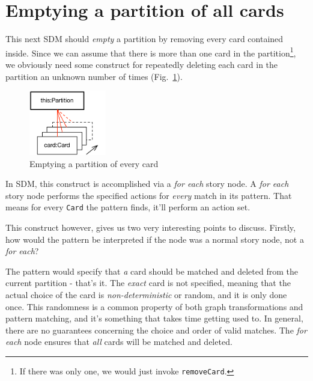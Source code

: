 \newpage
\section{Emptying a partition of all cards}
\genHeader
\hypertarget{sec:emptyPartition}{}

This next SDM should \emph{empty} a partition by removing every card contained inside. Since we can assume that there is more than one card in the
partition\footnote{If there was only one, we would just invoke \texttt{removeCard}.}, we obviously need some construct for repeatedly deleting each card in the
partition an unknown number of times (Fig.~\ref{fig:goal_empty}). 

\vspace{0.5cm}

\begin{figure}[htbp]
	\centering
  \includegraphics[width=0.3\textwidth]{goal_partitionEmpty.pdf}
	\caption{Emptying a partition of every card}
	\label{fig:goal_empty}
\end{figure}
\FloatBarrier

\vspace{0.5cm}

In SDM, this  construct is accomplished via a \emph{for each} story node. A
\emph{for each} story node performs the specified actions for \emph{every} match in its pattern. That means for every \texttt{Card} the pattern finds, it'll
perform an action set.

This construct however, gives us two very interesting points to discuss. Firstly, how would the pattern be interpreted if the node was a normal story node, not
a \emph{for each}?

The pattern would specify that \emph{a} card should be matched and deleted from the current partition - that's it. The \emph{exact} card is not specified,
meaning that the actual choice of the card is \emph{non-deterministic} or random, and it is only done once. This randomness is a common property of both graph
transformations and pattern matching, and it's something that takes time getting used to.  In general, there are no guarantees concerning the choice and
order of valid matches. The \emph{for each} node ensures that \emph{all} cards will be matched and deleted.

